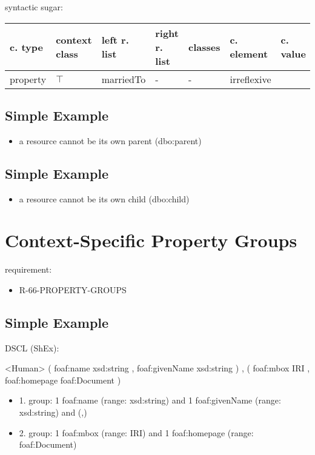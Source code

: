 \documentclass{llncs}
\newenvironment{gcotable}{
  \scriptsize
  \sffamily
  \vspace{0.3cm}
	\begin{center}
  \begin{tabular}{l|l|l|l|l|l|l}
  \hline
  \textbf{c. type} & \textbf{context class} & \textbf{left r. list} & \textbf{right r. list} & \textbf{classes} & \textbf{c. element} & \textbf{c. value} \\
  \hline

}{
  \hline
  \end{tabular}
	\end{center}
}
\begin{document}
syntactic sugar:

\begin{gcotable}
property & $\top$ & marriedTo & - & - & irreflexive \\
\end{gcotable}

\subsection{Simple Example}

\begin{itemize}
	\item a resource cannot be its own parent (dbo:parent)
\end{itemize}

\subsection{Simple Example}

\begin{itemize}
	\item a resource cannot be its own child (dbo:child)
\end{itemize}

\section{Context-Specific Property Groups}

requirement:

\begin{itemize}
	\item R-66-PROPERTY-GROUPS
\end{itemize}



\subsection{Simple Example}

DSCL (ShEx):
\begin{ex}
<Human> { 
    (  
        foaf:name xsd:string ,
        foaf:givenName xsd:string 
    ) ,
    (
        foaf:mbox IRI ,
        foaf:homepage foaf:Document
    ) }
\end{ex}

\begin{itemize}
	\item 1. group: 1 foaf:name (range: xsd:string) and 1 foaf:givenName (range: xsd:string) and (,)
	\item 2. group: 1 foaf:mbox (range: IRI) and 1 foaf:homepage (range: foaf:Document) 
\end{itemize}
\end{document}
